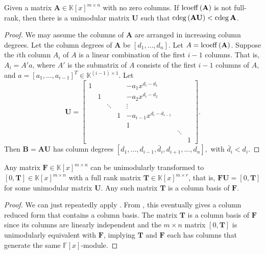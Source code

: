 \begin{lem}
\label{lem:columnOperationToReduceDegree}Given a matrix $\mathbf{A}\in\mathbb{K}\left[x\right]^{m\times n}$
with no zero columns. If $\operatorname{lcoeff}\left(\mathbf{A}\right)$ is not
full-rank, then there is a unimodular matrix $\mathbf{U}$ such that
$\cdeg\left(\mathbf{A}\mathbf{U}\right)<\cdeg\mathbf{A}$.\end{lem}
\begin{proof}
We may assume the columns of $\mathbf{A}$ are arranged in increasing
column degrees. Let the column degrees of $\mathbf{A}$ be $\left[d_{1},\dots,d_{n}\right]$.
Let $A=\operatorname{lcoeff}\left(\mathbf{A}\right)$. Suppose the $i$th column
$A_{i}$ of $A$ is a linear combination of the first $i-1$ columns.
That is, $A_{i}=A'a$, where $A'$ is the submatrix of $A$ consists
of the first $i-1$ columns of $A$, and $a=\left[a_{1},\dots,a_{i-1}\right]^{T}\in\mathbb{K}^{(i-1)\times1}$.
Let 
\[
\mathbf{U}=\begin{bmatrix}1 &  &  &  & -a_{1}x^{d_{i}-d_{1}}\\
 & 1 &  &  & -a_{2}x^{d_{i}-d_{2}}\\
 &  & \ddots &  & \vdots\\
 &  &  & 1 & -a_{i-1}x^{d_{i}-d_{i-1}}\\
 &  &  &  & 1\\
 &  &  &  &  & \ddots\\
 &  &  &  &  &  & 1
\end{bmatrix}.
\]
Then $\mathbf{B}=\mathbf{A}\mathbf{U}$ has column degrees $\left[d_{1},\dots,d_{i-1},\bar{d}{}_{i},d_{i+1},\dots,d_{n}\right],$
with $\bar{d}_{i}<d_{i}$.\end{proof}
\begin{cor}
\label{cor:unimodularlyReduceToColumnBasis}Any matrix $\mathbf{F}\in\mathbb{K}\left[x\right]^{m\times n}$
can be unimodularly transformed to $\left[0,\mathbf{T}\right]\in\mathbb{K}\left[x\right]^{m\times n}$
with a full rank matrix $\mathbf{T}\in\mathbb{K}\left[x\right]^{m\times r}$,
that is, $\mathbf{F}\mathbf{U}=\left[0,\mathbf{T}\right]$ for some
unimodular matrix $\mathbf{U}$. Any such matrix $\mathbf{T}$ is
a column basis of $\mathbf{F}$.\end{cor}
\begin{proof}
We can just repeatedly apply .
From , this eventually
gives a column reduced form that contains a column basis. The matrix
$\mathbf{T}$ is a column basis of $\mathbf{F}$ since its columns
are linearly independent and the $m\times n$ matrix $\left[0,\mathbf{T}\right]$
is unimodularly equivalent with $\mathbf{F}$, implying $\mathbf{T}$
and $\mathbf{F}$ each has columns that generate the same $\mathbb{F}\left[x\right]$-module.
\end{proof}
